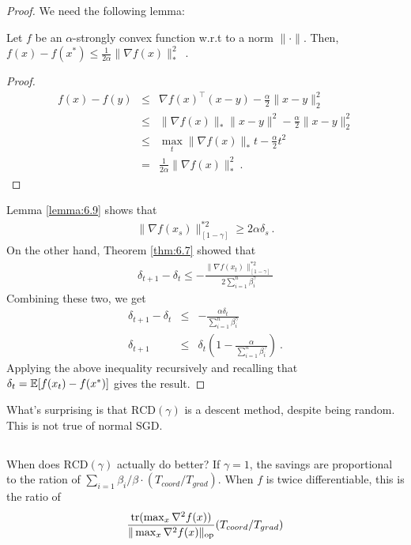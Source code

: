 	\begin{proof} We need the following lemma:
  \begin{lemma}
    \label{lemma:6.9} 
    Let $f$ be an $\alpha$-strongly convex function w.r.t to a norm
    $\|\cdot\|$. Then, $f(x) - f(x^*) \le \frac{1}{2\alpha} \|\nabla
    f(x)\|_*^2$\ .
	 \end{lemma}
	 \begin{proof}
	 \begin{eqnarray*}
     f(x) - f(y)
     &\le& \nabla f(x)^\top (x -y ) - \frac{\alpha}{2}\|x - y\|^2_2\\
	   &\le& \|\nabla f(x)\|_* \|x - y\|^2 - \frac{\alpha}{2}\|x - y\|^2_2\\
	   &\le& \max_t \|\nabla f(x)\|_* t - \frac{\alpha}{2}t^2\\
	 	 &=&  \frac{1}{2\alpha} \|\nabla f(x)\|_*^2 \ .
	 \end{eqnarray*}
	 \end{proof}

   Lemma \ref{lemma:6.9} shows that 
	 \begin{eqnarray*}
     \|\nabla f(x_s)\|^{*2}_{[1-\gamma]}
     \ge 2 \alpha \delta_s \ .
	 \end{eqnarray*}
   On the other hand, Theorem \ref{thm:6.7} showed that
   \begin{eqnarray}
   \delta_{t+1} - \delta_t \le -\frac{\|\nabla f(x_t)\|^{*2}_{[1-\gamma]}}{2\sum_{i=1}^n \beta_i^{\gamma}} 
   \end{eqnarray}
   Combining these two, we get
	 \begin{eqnarray}
     \delta_{t+1} - \delta_t &\le& -\frac{\alpha \delta_t}{\sum_{i=1}^n \beta_i^{\gamma}}  \\
     \delta_{t+1} &\le&  \delta_t \left(1  -\frac{\alpha}{\sum_{i=1}^n \beta_i^{\gamma}} \right)~.
	 \end{eqnarray}
   Applying the above inequality recursively and recalling that
   $\delta_t = \operatorname*{\mathbb{E}}[f(x_t) - f(x^*)]$ gives the result.

	\end{proof}

	 What's surprising is that $\mathrm{RCD}(\gamma)$ is a descent method, despite being random. This is not true of normal SGD. 


	\subsection{}
	When does $\mathrm{RCD}(\gamma)$ actually do better? If $\gamma = 1$, the savings are proportional to the ration of $\sum_{i=1} \beta_i / \beta \cdot (T_{coord}/T_{grad})$. When $f$ is twice differentiable, this is the ratio of 
	\begin{eqnarray}
	\frac{\mathrm{tr}(\max_{x} \nabla^2 f(x))}{\|\max_{x} \nabla^2 f(x)\|_{\mathrm{op}}} (T_{coord}/T_{grad})
	\end{eqnarray}
